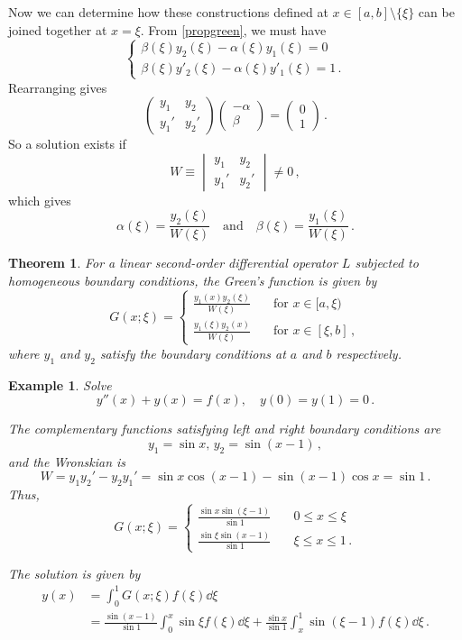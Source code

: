 \documentclass{article}
\theoremstyle{plain}\theoremheaderfont{\normalfont\itshape}\theorembodyfont{\rmfamily}\theoremseparator{.}\newtheorem*{rem}{Remark}\newtheorem*{ex}{Example}\newtheorem*{proof}{Proof}\newtheorem*{altp}{Alternative proof}
\theoremstyle{plain}\theoremheaderfont{\normalfont\bfseries}\theorembodyfont{\rmfamily}\theoremseparator{.}\newtheorem{thm}{Theorem}[section]\newtheorem{lem}[thm]{Lemma}\newtheorem{prop}[thm]{Proposition}\newtheorem*{cor}{Corollary}\newtheorem{defn}[thm]{Definition}\newtheorem{clm}[thm]{Claim}\newtheorem{clminproof}{Claim}
\theoremstyle{break}\theoremheaderfont{\normalfont\itshape}\theorembodyfont{\rmfamily}\theoremseparator{.\medskip}\newtheorem*{proofskip}{Proof}\newtheorem*{exs}{Examples}\newtheorem*{rems}{Remarks}
\theoremstyle{break}\theoremheaderfont{\normalfont\bfseries}\theorembodyfont{\rmfamily}\theoremseparator{.\medskip}\newtheorem{lemskip}[thm]{Lemma}\newtheorem{defnskip}[thm]{Definition}\newtheorem{propskip}[thm]{Proposition}\newtheorem{thmskip}[thm]{Theorem}
\numberwithin{equation}{section}
\begin{document}
	Now we can determine how these constructions defined at \(x\in[a,b]\setminus\{\xi\}\) can be joined together at \(x=\xi\). From \cref{propgreen}, we must have
	\[\begin{cases}
		\beta(\xi)y_2(\xi)-\alpha(\xi)y_1(\xi)=0\\
		\beta(\xi)y'_2(\xi)-\alpha(\xi)y'_1(\xi)=1\,.
	\end{cases}\]
	Rearranging gives
	\[\begin{pmatrix}
		y_1 & y_2\\
		y_1' & y_2'
	\end{pmatrix}\begin{pmatrix}
		-\alpha\\
		\beta
	\end{pmatrix}=\begin{pmatrix}
		0\\
		1
	\end{pmatrix}\,.\]
	So a solution exists if
	\[W\equiv\begin{vmatrix}
		y_1 & y_2\\
		y_1' & y_2'
	\end{vmatrix}\ne 0\,,\]
	which gives
	\[\alpha(\xi)=\frac{y_2(\xi)}{W(\xi)}\quad \text{and} \quad \beta(\xi)=\frac{y_1(\xi)}{W(\xi)}\,.\]

	\begin{thm}\label{bcgreens}
		For a linear second-order differential operator \(L\) subjected to homogeneous boundary conditions, the Green's function is given by
		\[G(x;\xi)=\left\{\begin{aligned}
			\frac{y_1(x)y_2(\xi)}{W(\xi)} & \quad\text{for }x\in[a,\xi)\\
			\frac{y_1(\xi)y_2(x)}{W(\xi)} & \quad\text{for }x\in[\xi,b]\,,
		\end{aligned}\right.\]
		where \(y_1\) and \(y_2\) satisfy the boundary conditions at \(a\) and \(b\) respectively.
	\end{thm}
	
	\begin{ex}
		Solve
		\[y''(x)+y(x)=f(x),\quad y(0)=y(1)=0\,.\]
		
		The complementary functions satisfying left and right boundary conditions are
		\[y_1=\sin{x},\, y_2=\sin(x-1)\,,\]
		and the Wronskian is
		\[W=y_1y_2'-y_2y_1'=\sin{x}\cos(x-1)-\sin(x-1)\cos{x}=\sin{1}\,.\]
		Thus,
		\[G(x;\xi)=\left\{\begin{aligned}
			\frac{\sin{x}\sin(\xi-1)}{\sin{1}} & \quad 0\le x\le \xi\\
			\frac{\sin{\xi}\sin(x-1)}{\sin{1}} & \quad \xi\le x\le 1\,.
		\end{aligned}\right.\]
		
		The solution is given by
		\begin{align*}
			y(x)&=\int_{0}^{1}G(x;\xi)f(\xi)\dd{\xi}\\
			&=\frac{\sin(x-1)}{\sin{1}}\int_{0}^{x}\sin{\xi} f(\xi)\dd{\xi}+\frac{\sin{x}}{\sin{1}}\int_{x}^{1}\sin(\xi-1)f(\xi)\dd{\xi}\,.
		\end{align*}
	\end{ex}
	
\end{document}
